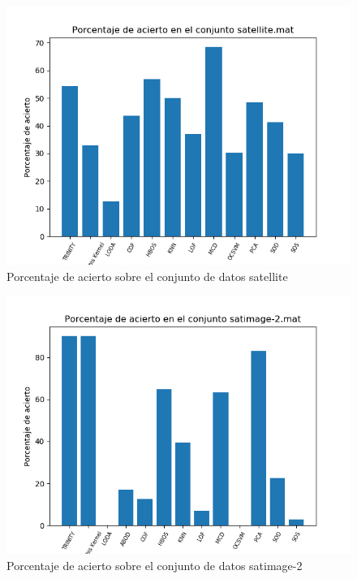 \begin{figure}[H]
	\centering
	\label{satellite_accuracy}
	\includegraphics[scale=0.7]{imagenes/imgs-exp1/accuracy/satellite}
	\caption{Porcentaje de acierto sobre el conjunto de datos satellite}
\end{figure}

\begin{figure}[H]
	\centering
	\label{satimage-2_accuracy}
	\includegraphics[scale=0.7]{imagenes/imgs-exp1/accuracy/satimage-2}
	\caption{Porcentaje de acierto sobre el conjunto de datos satimage-2}
\end{figure}

